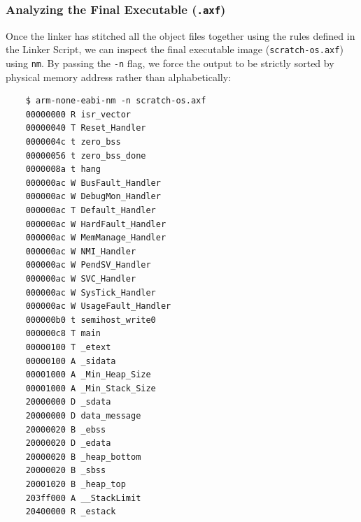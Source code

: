 \subsubsection{Analyzing the Final Executable (\texttt{.axf})}
Once the linker has stitched all the object files together using the rules defined in the Linker Script, we can inspect the final executable image (\texttt{scratch-os.axf}) using \texttt{nm}. By passing the \texttt{-n} flag, we force the output to be strictly sorted by physical memory address rather than alphabetically:

\begin{lstlisting}
    $ arm-none-eabi-nm -n scratch-os.axf
    00000000 R isr_vector
    00000040 T Reset_Handler
    0000004c t zero_bss
    00000056 t zero_bss_done
    0000008a t hang
    000000ac W BusFault_Handler
    000000ac W DebugMon_Handler
    000000ac T Default_Handler
    000000ac W HardFault_Handler
    000000ac W MemManage_Handler
    000000ac W NMI_Handler
    000000ac W PendSV_Handler
    000000ac W SVC_Handler
    000000ac W SysTick_Handler
    000000ac W UsageFault_Handler
    000000b0 t semihost_write0
    000000c8 T main
    00000100 T _etext
    00000100 A _sidata
    00001000 A _Min_Heap_Size
    00001000 A _Min_Stack_Size
    20000000 D _sdata
    20000000 D data_message
    20000020 B _ebss
    20000020 D _edata
    20000020 B _heap_bottom
    20000020 B _sbss
    20001020 B _heap_top
    203ff000 A __StackLimit
    20400000 R _estack
\end{lstlisting}

